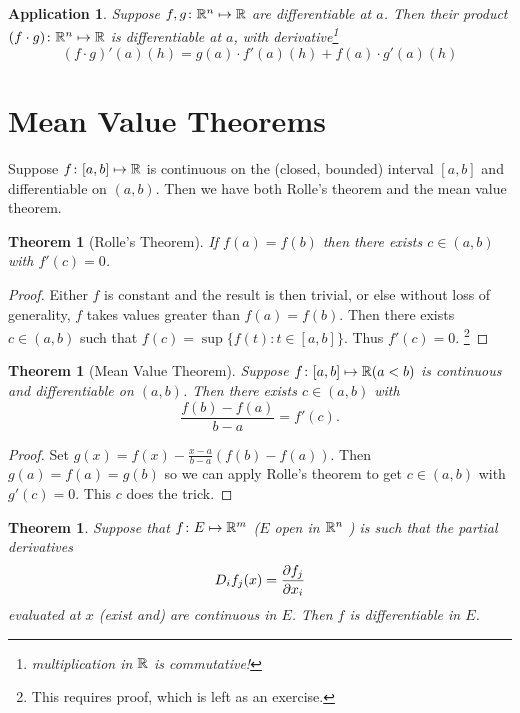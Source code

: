 \documentclass{notes}
\theoremstyle{plain}
\newtheorem{theorem}[proposition]{Theorem}
\newtheorem*{application}{Application}
\begin{document}
\begin{application}
Suppose $ f,g\colon  \mathbb{R}^{n} \mapsto \mathbb{R} $ are differentiable at $ a $. 
Then their product ${(f \cdot g)\colon \mathbb{R}^n \mapsto \mathbb{R}}$ is differentiable 
at $ a $, with derivative\footnote{multiplication in $ \mathbb{R} $ is commutative!}
\[ (f\cdot g)'(a)(h) = g(a)\cdot f'(a)(h) + f(a)\cdot g'(a)(h) \]
\end{application}

\section{Mean Value Theorems}

Suppose $ f\colon [a,b]\mapsto \mathbb{R} $ is continuous on the (closed,
bounded) interval $ [a,b] $ and differentiable on $ (a,b) $. Then we
have both Rolle's theorem and the mean value theorem.

\begin{theorem}[Rolle's Theorem]
If $ f(a)=f(b) $ then there exists $ c \in (a,b) $ with $ f'(c)=0 $.
\end{theorem}

\begin{proof}
  Either $ f $ is constant and the result is then trivial, or else
  without loss of generality, $ f $ takes values greater than
  $f(a)=f(b) $.  Then there exists $ c \in (a,b) $ such that $f(c) =
  \sup \{ f(t):t \in [a,b] \}$.  Thus $ f'(c)=0 $.%
\footnote{This requires proof, which is left as an exercise.}
\end{proof}

\begin{theorem}[Mean Value Theorem]
Suppose $ f\colon [a,b] \mapsto \mathbb{R} (a<b) $ is continuous and 
differentiable on $ (a,b) $. Then there exists $ c \in (a,b) $ with
\[ \frac{f(b)-f(a)}{b-a} = f'(c). \]
\end{theorem}

\begin{proof}
  Set $g(x)=f(x)-\frac{x-a}{b-a}(f(b)-f(a))$.  Then $ g(a)=f(a)=g(b) $
  so we can apply Rolle's theorem to get $ c \in (a,b) $ with $
  g'(c)=0 $.  This $c$ does the trick.
\end{proof}

\begin{theorem}
Suppose that $ f\colon E \mapsto \mathbb{R}^{m} $ ($ E $ open in $ \mathbb{R} 
^{n} $ ) is such that the partial derivatives \[ D_{i}f_{j}(x) = 
\frac{\partial f_{j}}{\partial x_{i}} \] evaluated at $ x $ (exist and) are continuous 
in $ E $. Then $ f $ is differentiable in $ E $.
\end{theorem}
\end{document}

